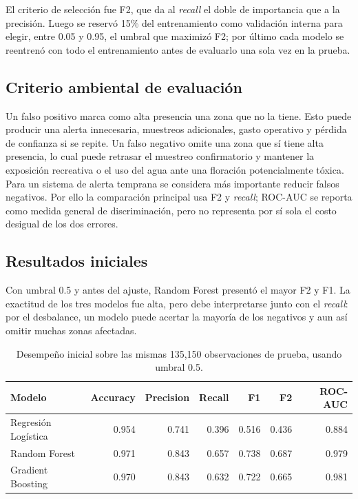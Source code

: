 \documentclass[10pt,a4paper]{article}
\begin{document}
El criterio de selección fue F2, que da al \textit{recall} el doble de importancia que a la precisión. Luego se
reservó 15\% del entrenamiento como validación interna para elegir, entre 0.05 y 0.95, el umbral que maximizó F2;
por último cada modelo se reentrenó con todo el entrenamiento antes de evaluarlo una sola vez en la prueba.

\subsection{Criterio ambiental de evaluación}

Un falso positivo marca como alta presencia una zona que no la tiene. Esto puede producir una alerta innecesaria,
muestreos adicionales, gasto operativo y pérdida de confianza si se repite. Un falso negativo omite una zona que sí
tiene alta presencia, lo cual puede retrasar el muestreo confirmatorio y mantener la exposición recreativa o el uso
del agua ante una floración potencialmente tóxica. Para un sistema de alerta temprana se considera más importante
reducir falsos negativos. Por ello la comparación principal usa F2 y \textit{recall}; ROC-AUC se reporta como medida
general de discriminación, pero no representa por sí sola el costo desigual de los dos errores.

\subsection{Resultados iniciales}

Con umbral 0.5 y antes del ajuste, Random Forest presentó el mayor F2 y F1. La exactitud de los tres modelos fue
alta, pero debe interpretarse junto con el \textit{recall}: por el desbalance, un modelo puede acertar la mayoría de
los negativos y aun así omitir muchas zonas afectadas.

\begin{table}[H]
  \centering
  \small
  \begin{tabular}{lrrrrrr}
    \toprule
    Modelo & Accuracy & Precision & Recall & F1 & F2 & ROC-AUC \\
    \midrule
    Regresión Logística & 0.954 & 0.741 & 0.396 & 0.516 & 0.436 & 0.884 \\
    Random Forest       & 0.971 & 0.843 & 0.657 & 0.738 & 0.687 & 0.979 \\
    Gradient Boosting   & 0.970 & 0.843 & 0.632 & 0.722 & 0.665 & 0.981 \\
    \bottomrule
  \end{tabular}
  \caption{Desempeño inicial sobre las mismas 135,150 observaciones de prueba, usando umbral 0.5.}
\end{table}
\end{document}
